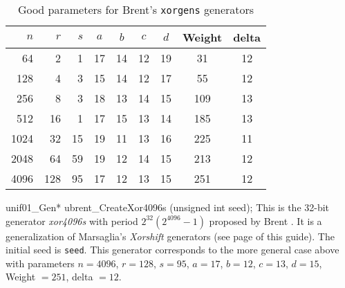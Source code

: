 \begin {table}
\centering
\label {tab:brentparam32}
\caption {Good parameters for Brent's \texttt{xorgens} generators}
\begin {tabular}{@{\extracolsep{15pt}}|rrrcccccc|}
\hline
    $n$ &  $r$  &   $s$ &   $a$ &  $b$ &  $c$ &  $d$ &  Weight & delta \\
\hline
 64  &   2  &  1  &  17  &  14  &  12  &  19  &  \phantom{1}31  &  12 \\
 128  &  4  &  3  &  15  &  14  &  12  &  17  &  \phantom{1}55  &  12 \\
 256  &  8  &  3  &  18  &  13  &  14  &  15  &  109  &  13 \\
 512  &  16  &  1  &  17  &  15  &  13  &  14  &  185  &  13 \\
 1024  &  32  &  15  &  19  &  11  &  13  &  16  &  225  &  11 \\
 2048  &  64  &  59  &  19  &  12  &  14  &  15  &  213  &  12 \\
 4096  &  128  &  95  &  17  &  12  &  13  &  15  &  251  &  12 \\
\hline
\end {tabular}
\end {table}
\code

unif01_Gen* ubrent_CreateXor4096s (unsigned int seed);
\endcode
  \tab This is the 32-bit generator  \textit{xor4096s} with period
 $2^{32}(2^{4096}-1)$ proposed by Brent \cite{rBRE04a}.
 It is a generalization of
 Marsaglia's \textit{Xorshift} generators \cite{rMAR03a} (see page
 \pageref{marsa-xorshift} of this guide).
  The initial seed is \texttt{seed}. This generator corresponds to the more
general case above with parameters
$n=4096$,  $r=128$,   $s=95$,  $a=17$,  $b=12$,  $c=13$, $d=15$,
 Weight $=251$,  delta $=12$.
%
  \endtab
\code


